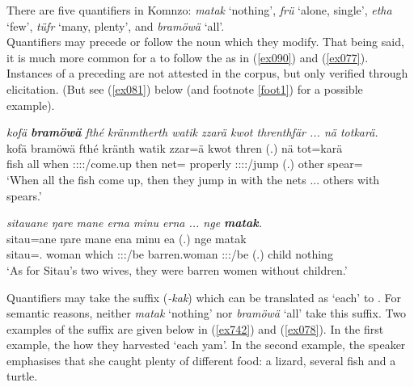 There are five quantifiers in Komnzo: \emph{matak} `nothing', \emph{frü} `alone, single', \emph{etha} `few', \emph{tüfr} `many, plenty', and \emph{bramöwä} `all'.\\

Quantifiers may precede or follow the noun which they modify. That being said, it is much more common for a  to follow the  as in (\ref{ex090}) and (\ref{ex077}). Instances of a preceding  are not attested in the corpus, but only verified through elicitation. (But see (\ref{ex081}) below (and footnote \ref{foot1}) for a possible example).

\begin{exe}
	\ex \emph{kofä \textbf{bramöwä} fthé kränmtherth watik zzarä kwot threnthfär ... nä totkarä.}\\
	\gll kofä bramöwä fthé kränth watik zzar=ä kwot thren (.) nä tot=karä\\
	fish all when \Stpl:\Sbj:\Irr:\Pfv:\Venit/come.up then net=\Assoc{} properly \Stpl:\Sbj:\Irr:\Pfv:\Venit{}/jump (.) other spear=\Prop{}\\
	\trans `When all the fish come up, then they jump in with the nets ... others with spears.'
	\label{ex090}
\end{exe}
\begin{exe}
	\ex \emph{sitauane ŋare mane erna minu erna ... nge \textbf{matak}.}\\
	\gll sitau=ane ŋare mane ena {minu} ea (.) nge matak\\
	sitau=\Poss.\Sg{} woman which \Stdu:\Sbj:\Pst:\Ipfv{}/be {barren.woman} \Stdu:\Sbj:\Pst:\Ipfv/be (.) child nothing\\
	\trans `As for Sitau's two wives, they were barren women without children.'\\
	\label{ex077}
\end{exe}

Quantifiers may take the  suffix (\emph{-kak}) which can be translated as `each' to . For semantic reasons, neither \emph{matak} `nothing' nor \emph{bramöwä} `all' take this suffix. Two examples of the  suffix are given below in (\ref{ex742}) and (\ref{ex078}). In the first example, the how they harvested `each yam'. In the second example, the speaker emphasises that she caught plenty of different food: a lizard, several fish and a turtle.

